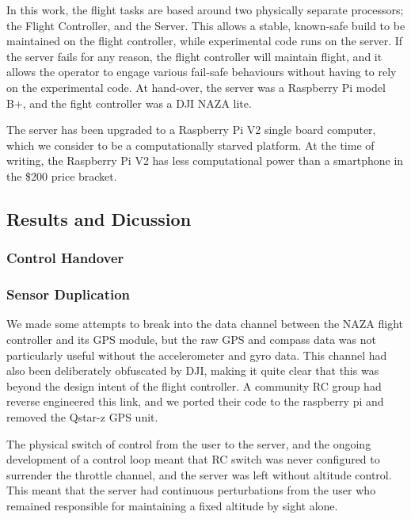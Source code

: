 \documentclass{article}
\begin{document}

    In this work, the flight tasks are based around two physically separate processors; the Flight Controller, and the Server. This allows a stable, known-safe build to be maintained on the flight controller, while experimental code runs on the server. If the server fails for any reason, the flight controller will maintain flight, and it allows the operator to engage various fail-safe behaviours without having to rely on the experimental code.
    At hand-over, the server was a Raspberry Pi model B+, and the fight controller was a DJI NAZA lite.
    
    The server has been upgraded to a Raspberry Pi V2 single board computer, which we consider to be a computationally starved platform.  At the time of writing, the Raspberry Pi V2 has less computational power than a smartphone in the \$200 price bracket.

  \subsection{Results and Dicussion}

    \subsubsection{Control Handover}


    \subsubsection{Sensor Duplication}

      We made some attempts to break into the data channel between the NAZA flight controller and its GPS module, but the raw GPS and compass data was not particularly useful without the accelerometer and gyro data.  This channel had also been deliberately obfuscated by DJI, making it quite clear that this was beyond the design intent of the flight controller.  A community RC group had reverse engineered this link, and we ported their code to the raspberry pi and removed the Qstar-z GPS unit.
      
      The physical switch of control from the user to the server, and the ongoing development of a control loop meant that RC switch was never configured to surrender the throttle channel, and the server was left without altitude control.  This meant that the server had continuous perturbations from the user who remained responsible for maintaining a fixed altitude by sight alone.
\end{document}
